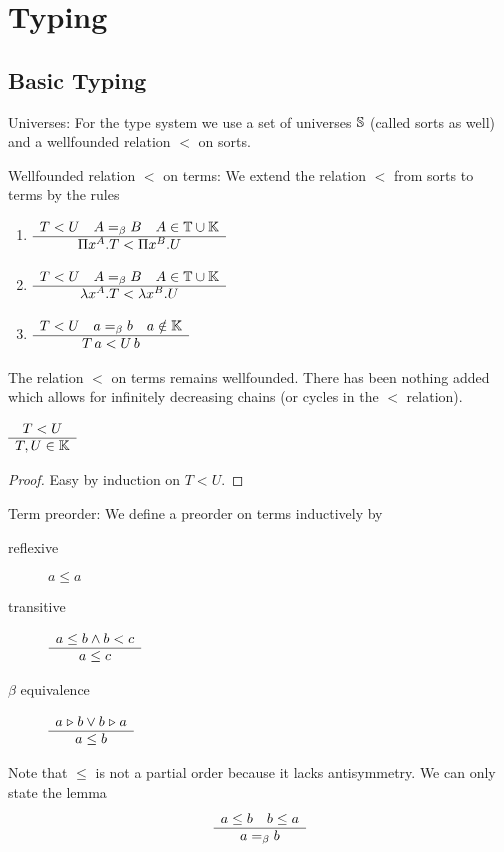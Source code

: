 \section{Typing}

\subsection{Basic Typing}


\begin{definition}
  Universes: For the type system we use a set of universes $\mathbb{S}$ (called
  sorts as well) and a wellfounded relation $<$ on sorts.
\end{definition}


\begin{definition}
  Wellfounded relation $<$ on terms: We extend the relation $<$ from sorts to
  terms by the rules
  \begin{enumerate}
  \item
    $ \begin{array}{c} T < U \quad A =_\beta B \quad A \in \mathbb{T} \cup \mathbb{K} \\ \hline \Pi x^A. T < \Pi x^B. U\end{array}$

  \item
    $ \begin{array}{c} T < U \quad A =_\beta B \quad A \in \mathbb{T} \cup \mathbb{K} \\ \hline \lambda x^A. T < \lambda x^B. U\end{array}$

  \item
    $ \begin{array}{c} T < U \quad a =_\beta b \quad a \notin \mathbb{K} \\ \hline T \, a  <  U \, b\end{array}$
  \end{enumerate}
  The relation $<$ on terms remains wellfounded. There has been nothing added
  which allows for infinitely decreasing chains (or cycles in the $<$ relation).
\end{definition}

\begin{theorem}
  $\begin{array}{c} T < U \\ \hline T,U \in \mathbb{K}\end{array}$
  \begin{proof}
    Easy by induction on $T < U$.
  \end{proof}
\end{theorem}

\begin{definition}
  Term preorder: We define a preorder on terms inductively by
  \begin{description}

  \item[reflexive] $ a \le a$

  \item[transitive] $\begin{array}{c}  a \le b \land b < c  \\ \hline a \le c\end{array}$

  \item[$\beta$ equivalence] $ \begin{array}{c} a \mathrel{\triangleright} b \lor b \mathrel{\triangleright} a \\ \hline a \le b\end{array} $
  \end{description}
  Note that $\le$ is not a partial order because it lacks antisymmetry. We can
  only state the lemma
  $$
  \begin{array}{c} a \le b \quad b \le a \\ \hline a =_\beta b\end{array}
  $$
\end{definition}



